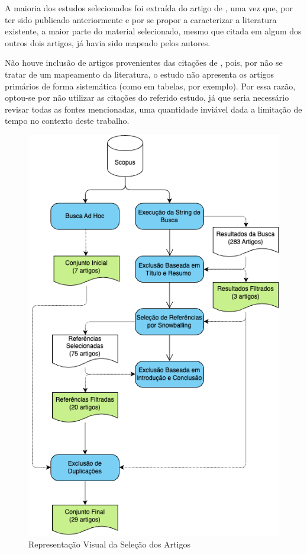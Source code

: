 A maioria dos estudos selecionados foi extraída do artigo de , uma vez que, por ter sido publicado anteriormente e por se propor a caracterizar a literatura existente, a maior parte do material selecionado, mesmo que citada em algum dos outros dois artigos, já havia sido mapeado pelos autores.

Não houve inclusão de artigos provenientes das citações de , pois, por não se tratar de um mapeamento da literatura, o estudo não apresenta os artigos primários de forma sistemática (como em tabelas, por exemplo). Por essa razão, optou-se por não utilizar as citações do referido estudo, já que seria necessário revisar todas as fontes mencionadas, uma quantidade inviável dada a limitação de tempo no contexto deste trabalho.


\begin{figure}
    \centering
    \caption{Representação Visual da Seleção dos Artigos}
    \includegraphics[width=0.7\linewidth]{figuras/selecao.png}
    \begin{center}
    \end{center}
    \label{fig:selecao}
\end{figure}


